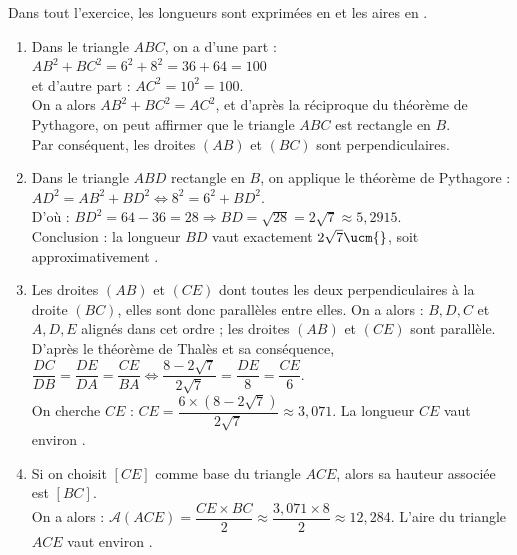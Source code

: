 \begin{corrige}
   Dans tout l'exercice, les longueurs sont exprimées en \ucm{} et les aires en \ucmq{}. \\
   \begin{enumerate}
      \item Dans le triangle $ABC$, on a d'une part : $AB^2+BC^2 =6^2+8^2 =36+64 =100$ \\
         et d'autre part : $AC^2 =10^2 =100$. \\
         On a alors $AB^2+BC^2 =AC^2$, et d'après la réciproque du théorème de Pythagore, on peut affirmer que le triangle $ABC$ est rectangle en $B$. \\
         Par conséquent, {\blue les droites $(AB)$ et $(BC)$ sont perpendiculaires}.
      \item Dans le triangle $ABD$ rectangle en $B$, on applique le théorème de Pythagore : \\
         $AD^2 =AB^2+BD^2 \iff 8^2 =6^2+BD^2$. \\
         D'où : $BD^2 =64-36 =28 \Longrightarrow BD =\sqrt{28} =2\sqrt7 \approx5,2915$. \\
         Conclusion : {\blue la longueur $BD$ vaut exactement $2\sqrt7\ucm{}$, soit approximativement }.
      \item Les droites $(AB)$ et $(CE)$ dont toutes les deux perpendiculaires à la droite $(BC)$, elles sont donc parallèles entre elles. On a alors : $B, D, C$ et $A, D, E$ alignés dans cet ordre ; les droites $(AB)$ et $(CE)$ sont parallèle. \\ [1mm]
         D'après le théorème de Thalès et sa conséquence, $\dfrac{DC}{DB} =\dfrac{DE}{DA} =\dfrac{CE}{BA} \iff \dfrac{8-2\sqrt7}{2\sqrt7} =\dfrac{DE}{8} =\dfrac{CE}{6}$. \\
         On cherche $CE$ : $CE =\dfrac{6\times(8-2\sqrt7)}{2\sqrt7} \approx3,071$. {\blue La longueur $CE$ vaut environ }. \smallskip
      \item Si on choisit $[CE]$ comme base du triangle $ACE$, alors sa hauteur associée est $[BC]$. \\ [1mm]
         On a alors : $\mathcal{A}(ACE) =\dfrac{CE\times BC}{2} \approx\dfrac{3,071\times8}{2} \approx12,284$. {\blue L'aire du triangle $ACE$ vaut environ }.
   \end{enumerate}
\end{corrige}

\bigskip


